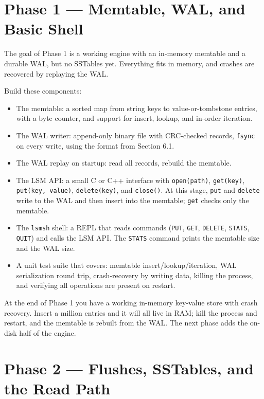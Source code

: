 \documentclass[11pt,a4paper]{article}
\begin{document}
\section{Phase 1 --- Memtable, WAL, and Basic Shell}

The goal of Phase 1 is a working engine with an in-memory memtable and a durable WAL, but no SSTables yet. Everything fits in memory, and crashes are recovered by replaying the WAL.

Build these components:

\begin{itemize}
\item The memtable: a sorted map from string keys to value-or-tombstone entries, with a byte counter, and support for insert, lookup, and in-order iteration.

\item The WAL writer: append-only binary file with CRC-checked records, \texttt{fsync} on every write, using the format from Section 6.1.

\item The WAL replay on startup: read all records, rebuild the memtable.

\item The LSM API: a small C or C++ interface with \texttt{open(path)}, \texttt{get(key)}, \texttt{put(key, value)}, \texttt{delete(key)}, and \texttt{close()}. At this stage, \texttt{put} and \texttt{delete} write to the WAL and then insert into the memtable; \texttt{get} checks only the memtable.

\item The \texttt{lsmsh} shell: a REPL that reads commands (\texttt{PUT}, \texttt{GET}, \texttt{DELETE}, \texttt{STATS}, \texttt{QUIT}) and calls the LSM API. The \texttt{STATS} command prints the memtable size and the WAL size.

\item A unit test suite that covers: memtable insert/lookup/iteration, WAL serialization round trip, crash-recovery by writing data, killing the process, and verifying all operations are present on restart.
\end{itemize}

At the end of Phase 1 you have a working in-memory key-value store with crash recovery. Insert a million entries and it will all live in RAM; kill the process and restart, and the memtable is rebuilt from the WAL. The next phase adds the on-disk half of the engine.

\section{Phase 2 --- Flushes, SSTables, and the Read Path}
\end{document}
